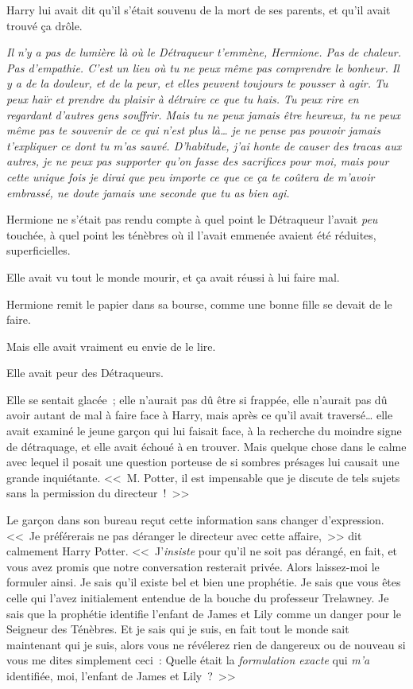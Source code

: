 Harry lui avait dit qu'il s'était souvenu de la mort de ses parents, et qu'il avait trouvé ça drôle.

\emph{Il n'y a pas de lumière là où le Détraqueur t'emmène, Hermione. Pas de chaleur. Pas d'empathie. C'est un lieu où tu ne peux même pas comprendre le bonheur. Il y a de la douleur, et de la peur, et elles peuvent toujours te pousser à agir. Tu peux haïr et prendre du plaisir à détruire ce que tu hais. Tu peux rire en regardant d'autres gens souffrir. Mais tu ne peux jamais être heureux, tu ne peux même pas te souvenir de ce qui n'est plus là… je ne pense pas pouvoir jamais t'expliquer ce dont tu m'as sauvé. D'habitude, j'ai honte de causer des tracas aux autres, je ne peux pas supporter qu'on fasse des sacrifices pour moi, mais pour cette unique fois je dirai que peu importe ce que ce ça te coûtera de m'avoir embrassé, ne doute jamais une seconde que tu as bien agi.}

Hermione ne s'était pas rendu compte à quel point le Détraqueur l'avait \emph{peu} touchée, à quel point les ténèbres où il l'avait emmenée avaient été réduites, superficielles.

Elle avait vu tout le monde mourir, et ça avait réussi à lui faire mal.

Hermione remit le papier dans sa bourse, comme une bonne fille se devait de le faire.

Mais elle avait vraiment eu envie de le lire.

Elle avait peur des Détraqueurs.


Elle se sentait glacée~; elle n'aurait pas dû être si frappée, elle n'aurait pas dû avoir autant de mal à faire face à Harry, mais après ce qu'il avait traversé… elle avait examiné le jeune garçon qui lui faisait face, à la recherche du moindre signe de détraquage, et elle avait échoué à en trouver. Mais quelque chose dans le calme avec lequel il posait une question porteuse de si sombres présages lui causait une grande inquiétante. <<~M. Potter, il est impensable que je discute de tels sujets sans la permission du directeur~!~>>

Le garçon dans son bureau reçut cette information sans changer d'expression. <<~Je préférerais ne pas déranger le directeur avec cette affaire,~>> dit calmement Harry Potter. <<~J'\emph{insiste} pour qu'il ne soit pas dérangé, en fait, et vous avez promis que notre conversation resterait privée. Alors laissez-moi le formuler ainsi. Je sais qu'il existe bel et bien une prophétie. Je sais que vous êtes celle qui l'avez initialement entendue de la bouche du professeur Trelawney. Je sais que la prophétie identifie l'enfant de James et Lily comme un danger pour le Seigneur des Ténèbres. Et je sais qui je suis, en fait tout le monde sait maintenant qui je suis, alors vous ne révélerez rien de dangereux ou de nouveau si vous me dites simplement ceci~: Quelle était la \emph{formulation exacte} qui \emph{m'a} identifiée, moi, l'enfant de James et Lily~?~>>

